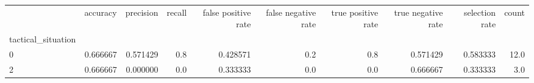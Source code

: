 \begin{tabular}{lrrrrrrrrr}
\toprule
{} &  accuracy &  precision &  recall &  false positive rate &  false negative rate &  true positive rate &  true negative rate &  selection rate &  count \\
tactical\_situation &           &            &         &                      &                      &                     &                     &                 &        \\
\midrule
0                  &  0.666667 &   0.571429 &     0.8 &             0.428571 &                  0.2 &                 0.8 &            0.571429 &        0.583333 &   12.0 \\
2                  &  0.666667 &   0.000000 &     0.0 &             0.333333 &                  0.0 &                 0.0 &            0.666667 &        0.333333 &    3.0 \\
\bottomrule
\end{tabular}
